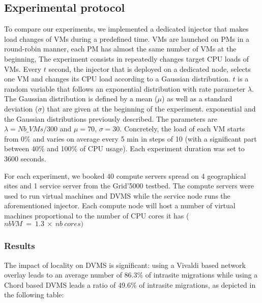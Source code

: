 \subsection{Experimental protocol}
To compare our experiments, we implemented a dedicated injector that makes load
changes of VMs during a predefined time.  VMs are launched on PMs in a
round-robin manner, \ie each PM has almost the same number of VMs at the
beginning, The experiment consists in  repeatedly changes target CPU loads of
VMs.  Every $t$ second, the injector that is deployed on a dedicated node,
selects one VM and changes its CPU load according to a Gaussian distribution.
$t$ is a random variable that follows an exponential distribution with rate
parameter $\lambda$. The Gaussian distribution is defined by a mean ($\mu$) as
well as a standard deviation ($\sigma$) that are given at the beginning of the
experiment. 
exponential and the Gaussian distributions previously described. 
The parameters are $\lambda=\mathit{Nb\_VMs}/300$ and $\mu=70$, $\sigma=30$.
Concretely, the load of each VM starts from 0\% and varies on average every 5
min in steps of 10 (with a significant part between 40\% and 100\% of CPU
usage).   Each experiment duration was set to 3600 seconds.

For each experiment, we booked 40 compute servers spread on 4 geographical sites
and 1 service server from the Grid'5000 testbed. The compute servers were used 
to run virtual machines and DVMS while the service node runs the aforementioned
injector.
%
Each compute node will host a number of virtual machines proportional to the 
number of CPU cores it has ($nb VM\ =\ 1.3\ \times\ nb\ cores)$

\subsubsection{Results}

The impact of locality on DVMS is significant: using a Vivaldi based network
overlay leads to an average number of 86.3\% of intrasite migrations while using 
a Chord based DVMS leads a ratio of 49.6\% of intrasite migrations, as depicted
in the following table:

